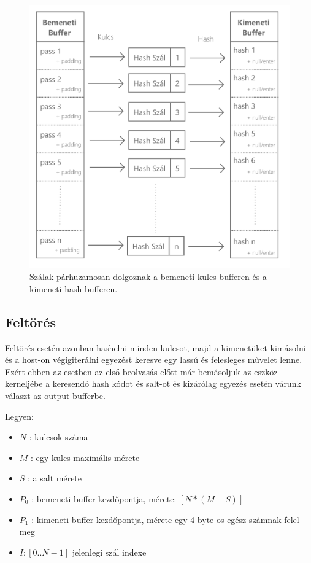 \begin{figure}[H]
    \centering
    \includegraphics[width=\textwidth]{images/pdf/parallel-hashing.pdf}
    \caption{Szálak párhuzamosan dolgoznak a bemeneti kulcs bufferen és a kimeneti hash bufferen.}
\end{figure}




\subsection{Feltörés}

Feltörés esetén azonban hashelni minden kulcsot, majd a kimenetüket kimásolni és a host-on végigiterálni egyezést keresve egy lassú és felesleges művelet lenne. Ezért ebben az esetben az első beolvasás előtt már bemásoljuk az eszköz kerneljébe a keresendő hash kódot és salt-ot és kizárólag egyezés esetén várunk választ az output bufferbe.

Legyen:
\begin{itemize}
    \itemsep-0.5em
    \item $ N $ : kulcsok száma
    \item $ M $ : egy kulcs maximális mérete
    \item $ S $ : a salt mérete
    \item $ P_0 $ : bemeneti buffer kezdőpontja, mérete: $[N * (M + S)]$
    \item $ P_1 $ : kimeneti buffer kezdőpontja, mérete egy 4 byte-os egész számnak felel meg
    \item $ I : [0 .. N-1]$ jelenlegi szál indexe
\end{itemize}


